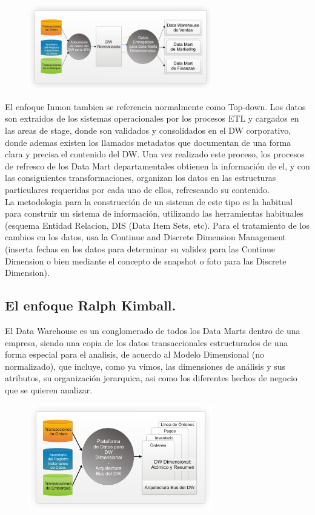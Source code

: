 \documentclass[11pt]{article}
\begin{document}
\begin{figure}[htb]
\begin{center}
\includegraphics[width=8cm]{./images/enfoque-inmon.jpg}
\end{center}
\end{figure}

El enfoque Inmon tambien se referencia normalmente como Top-down. Los datos son extraidos de los sistemas operacionales por los procesos ETL y cargados en las areas de stage, donde son validados y consolidados en el DW corporativo, donde ademas existen los llamados metadatos que documentan de una forma clara y precisa el contenido del DW. Una vez realizado este proceso, los procesos de refresco de los Data Mart departamentales obtienen la información de el, y con las consiguientes transformaciones, organizan los datos en las estructuras particulares requeridas por cada uno de ellos, refrescando su contenido.\\


La metodologia para la construcción de un sistema de este tipo es la habitual para construir un sistema de información, utilizando las herramientas habituales (esquema Entidad Relacion, DIS (Data Item Sets, etc). Para el tratamiento de los cambios en los datos, usa la Continue and Discrete Dimension Management (inserta fechas en los datos para determinar su validez para las Continue Dimension o bien mediante el concepto de snapshot o foto para las Discrete Dimension).

\subsection{El enfoque Ralph Kimball.}
El Data Warehouse es un conglomerado de todos los Data Marts dentro de una empresa, siendo una copia de los datos transaccionales estructurados de una forma especial para el analisis, de acuerdo al Modelo Dimensional (no normalizado), que incluye, como ya vimos, las dimensiones de análisis y sus atributos, su organización jerarquica, asi como los diferentes hechos de negocio que se quieren analizar.

\begin{figure}[htb]
\begin{center}
\includegraphics[width=8cm]{./images/enfoque-kimball.jpg}
\end{center}
\end{figure}
\end{document}
